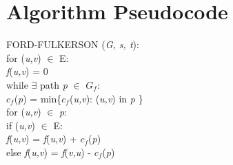\documentclass[12pt, letterpaper]{article}
\newcommand\tab[1][1cm]{\hspace*{#1}}
\begin{document}
\section{Algorithm  Pseudocode}
FORD-FULKERSON (\textit{G, s, t}):\\
for (\textit{u,v}) $\in$ E:\\
\tab \textit{f}(\textit{u,v}) = 0\\
while $\exists$ path \textit{p} $\in$ $G_f$:\\
\tab $c_f$(\textit{p}) = min\{$c_f$(\textit{u,v}): (\textit{u,v}) in \textit{p}  \}\\
\tab for (\textit{u,v}) $\in$ \textit{p}:\\
\tab \tab if (\textit{u,v}) $\in$ E:\\
\tab \tab \tab \textit{f}(\textit{u,v}) = \textit{f}(\textit{u,v}) + $c_f$(\textit{p})\\
\tab \tab else \textit{f}(\textit{u,v}) = \textit{f}(\textit{v,u}) - $c_f$(\textit{p})\\
\end{document}
